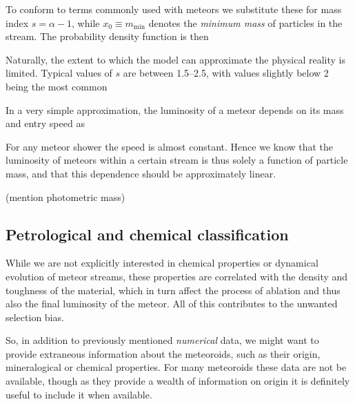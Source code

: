             To conform to terms commonly used with meteors we substitute these for mass index
            $s = \alpha - 1$, while $x_0 \equiv m_\mathrm{min}$ denotes the \emph{minimum mass} of particles in the stream.
            The probability density function is then 

            Naturally, the extent to which the model can approximate the physical reality is limited.
            Typical values of $s$ are between \numrange{1.5}{2.5}, with values slightly below 2 being the most common \cite{...}

            In a very simple approximation, the luminosity of a meteor depends on its mass and entry speed as

            For any meteor shower the speed is almost constant. Hence we know that the luminosity of meteors
            within a certain stream is thus solely a function of particle mass, and that this dependence should
            be approximately linear.

            (mention photometric mass)

        \subsection{Petrological and chemical classification} \label{mpac}
            While we are not explicitly interested in chemical properties
            or dynamical evolution of meteor streams, these properties
            are correlated with the density and toughness of the material,
            which in turn affect the process of ablation
            and thus also the final luminosity of the meteor.
            All of this contributes to the unwanted selection bias.

            So, in addition to previously mentioned \textit{numerical} data, we might want to
            provide extraneous information about the meteoroids, such as their origin,
            mineralogical or chemical properties.
            For many meteoroids these data are not be available,
            though as they provide a wealth of information on origin
            it is definitely useful to include it when available.

